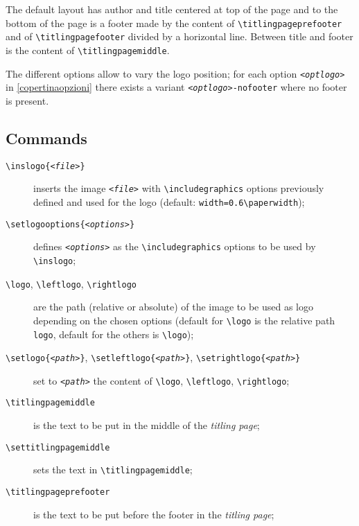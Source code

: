 \documentclass[a4paper,oneside,centered,noparindent,noparskip]{bookest}
\begin{document}
\ppar
The default layout has author and title centered at top of the page and to the bottom of the page is a footer made by the content of \texttt{\textbackslash titlingpageprefooter} and of \texttt{\textbackslash titlingpagefooter} divided by a horizontal line. Between title and footer is the content of \texttt{\textbackslash titlingpagemiddle}.

The different options allow to vary the logo position; for each option \texttt{\textit{<optlogo>}} in \ref{copertinaopzioni} there exists a variant \texttt{\textit{<optlogo>}-nofooter} where no footer is present.

\subsection{Commands}
\begin{description}
 \item[\texttt{\textbackslash inslogo\{\textit{<file>}\}}] inserts the image \texttt{\textit{<file>}} with \texttt{\textbackslash includegraphics} options previously defined and used for the logo (default: \texttt{width=0.6\textbackslash paperwidth});
 \item[\texttt{\textbackslash setlogooptions\{\textit{<options>}\}}] defines \texttt{\textit{<options>}} as the \texttt{\textbackslash includegraphics} options to be used by \texttt{\textbackslash inslogo};
 \item[\texttt{\textbackslash logo}, \texttt{\textbackslash leftlogo}, \texttt{\textbackslash rightlogo}] are the path (relative or absolute) of the image to be used as logo depending on the chosen options (default for \texttt{\textbackslash logo} is the relative path \texttt{logo}, default for the others is \texttt{\textbackslash logo});
 \item[\texttt{\textbackslash setlogo\{\textit{<path>}\}}, \texttt{\textbackslash setleftlogo\{\textit{<path>}\}}, \texttt{\textbackslash setrightlogo\{\textit{<path>}\}}] set to \texttt{\textit{<path>}} the content of \texttt{\textbackslash logo}, \texttt{\textbackslash leftlogo}, \texttt{\textbackslash rightlogo};
 \item[\texttt{\textbackslash titlingpagemiddle}] is the text to be put in the middle of the \emph{titling page};
 \item[\texttt{\textbackslash settitlingpagemiddle}] sets the text in \texttt{\textbackslash titlingpagemiddle};
 \item[\texttt{\textbackslash titlingpageprefooter}] is the text to be put before the footer in the \emph{titling page};

\end{description}
\end{document}
